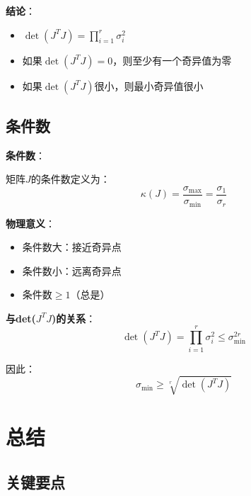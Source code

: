 \documentclass[12pt,a4paper]{article}
\begin{document}
\textbf{结论}：
\begin{itemize}
\item $\det(J^T J) = \prod_{i=1}^r \sigma_i^2$
\item 如果$\det(J^T J) = 0$，则至少有一个奇异值为零
\item 如果$\det(J^T J)$很小，则最小奇异值很小
\end{itemize}

\subsection{条件数}

\textbf{条件数}：

矩阵$J$的条件数定义为：
\begin{equation}
\kappa(J) = \frac{\sigma_{\max}}{\sigma_{\min}} = \frac{\sigma_1}{\sigma_r}
\end{equation}

\textbf{物理意义}：
\begin{itemize}
\item 条件数大：接近奇异点
\item 条件数小：远离奇异点
\item 条件数$\geq 1$（总是）
\end{itemize}

\textbf{与det($J^T J$)的关系}：
\begin{equation}
\det(J^T J) = \prod_{i=1}^r \sigma_i^2 \leq \sigma_{\min}^{2r}
\end{equation}

因此：
\begin{equation}
\sigma_{\min} \geq \sqrt[r]{\det(J^T J)}
\end{equation}

\section{总结}

\subsection{关键要点}
\end{document}
